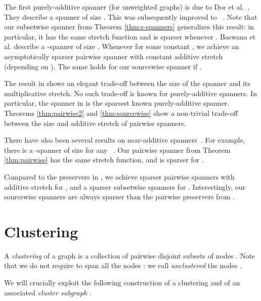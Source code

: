 \documentclass[a4paper,11pt]{article}
\theoremstyle{definition}
\begin{document}
The first purely-additive spanner (for unweighted graphs) is due to Dor et al.~\cite{DHZ97}. They describe a  spanner of 
size . This was subsequently improved to ~\cite{EP04}. Note that our subsetwise spanner from Theorem \ref{thm:s-spanners} generalizes this result: in particular, it has the same stretch function and is sparser whenever .
Baswana et al. \cite{BKMP05} describe a -spanner of size . Whenever  for some constant , we achieve an asymptotically sparser pairwise spanner with constant additive stretch (depending on ). The same holds for our sourcewise spanner if .






The result in \cite{HZ96} shows an elegant trade-off between the size of the spanner and its multiplicative stretch. No such trade-off is known for purely-additive spanners. In particular, the spanner in \cite{BKMP05} is the sparsest known purely-additive spanner. Theorems \ref{thm:pairwise2} and \ref{thm:sourcewise} show a non-trivial trade-off between the size and additive stretch of pairwise spanners. 

There have also been several results on near-additive spanners~\cite{EP04,E05,TZ06}. For example, there is a -spanner of size  for any 
~\cite{EP04}. Our pairwise spanner from Theorem \ref{thm:pairwise} has the same stretch function, and is sparser for . 

Compared to the preservers in \cite{CE05}, we achieve sparser  pairwise spanners with additive stretch  for , and a sparser subsetwise spanners for . 
Interestingly, our sourcewise spanners are always sparser than the pairwise preservers from \cite{CE05}. 








\section{Clustering}
\label{section-clustering}

A \emph{clustering} of a graph  is a collection  of pairwise disjoint subsets of nodes . Note that we do not require  to span all the nodes : we call \emph{unclustered} the nodes .

We will crucially exploit the following construction of a clustering  and of an associated \emph{cluster subgraph} .
\end{document}
